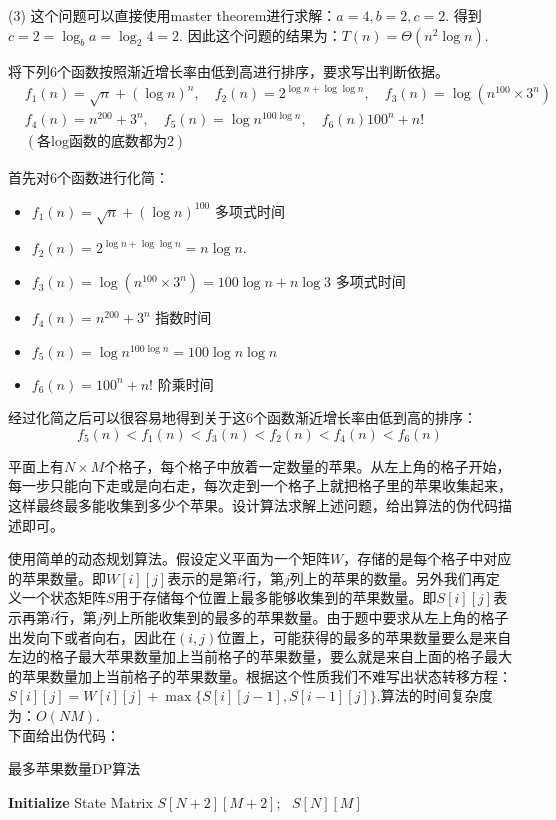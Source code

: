 \documentclass{myhw}
\begin{document}
\begin{solution}
(3) 这个问题可以直接使用master theorem进行求解：$a=4,b=2,c=2$.
得到$c=2=\log_b a=\log_2 4=2$.
因此这个问题的结果为：$T(n)=\Theta(n^2\log n)$.
\end{solution}
\begin{homeworkProblem}
将下列6个函数按照渐近增长率由低到高进行排序，要求写出判断依据。
\[
\begin{split}
&f_1(n)=\sqrt{n}+(\log n)^n,\quad f_2(n)=2^{\log n +\log \log n},\quad f_3(n)=\log\left(n^{100}\times 3^n\right)\\
& f_4(n)=n^{200}+3^{n},\quad f_5(n)=\log n^{100\log n},\quad f_6(n)100^n+n!\\
&(\text{各log函数的底数都为}2)
\end{split}
\]
\end{homeworkProblem}
\begin{solution}
首先对6个函数进行化简：
\begin{itemize}
\item $f_1(n)=\sqrt{n}+(\log n)^{100}$ 多项式时间
\item $f_2(n)=2^{\log n+\log \log n}=n\log n$.
\item $f_3(n)=\log (n^{100}\times 3^n)=100\log n+n\log 3$ 多项式时间
\item $f_4(n)=n^{200}+3^n$ 指数时间
\item $f_5(n)=\log n ^{100\log n}=100 \log n \log n$
\item $f_6(n)=100^n+n!$ 阶乘时间
\end{itemize}
经过化简之后可以很容易地得到关于这6个函数渐近增长率由低到高的排序：
\[
f_5(n)<f_1(n)<f_3(n)<f_2(n)<f_4(n)<f_6(n)
\]
\end{solution}
\begin{homeworkProblem}
平面上有$N\times M$个格子，每个格子中放着一定数量的苹果。从左上角的格子开始，每一步只能向下走或是向右走，每次走到一个格子上就把格子里的苹果收集起来，这样最终最多能收集到多少个苹果。设计算法求解上述问题，给出算法的伪代码描述即可。
\end{homeworkProblem}
\begin{solution}
使用简单的动态规划算法。假设定义平面为一个矩阵$W$，存储的是每个格子中对应的苹果数量。即$W[i][j]$表示的是第$i$行，第$j$列上的苹果的数量。另外我们再定义一个状态矩阵$S$用于存储每个位置上最多能够收集到的苹果数量。即$S[i][j]$表示再第$i$行，第$j$列上所能收集到的最多的苹果数量。由于题中要求从左上角的格子出发向下或者向右，因此在$(i,j)$位置上，可能获得的最多的苹果数量要么是来自左边的格子最大苹果数量加上当前格子的苹果数量，要么就是来自上面的格子最大的苹果数量加上当前格子的苹果数量。根据这个性质我们不难写出状态转移方程：$S[i][j]=W[i][j]+\max\{S[i][j-1],S[i-1][j]\}$.算法的时间复杂度为：$O(NM)$.\\
下面给出伪代码：\\
\begin{algorithm}[H]
\caption{最多苹果数量DP算法}
\LinesNumbered
{}
\textbf{Initialize} State Matrix $S[N+2][M+2]$;\;
\
\Return $S[N][M]$ 
\end{algorithm}
\end{solution}
\end{document}
